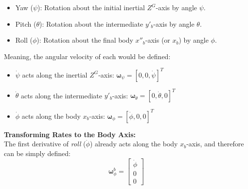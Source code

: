 \documentclass[conf]{new-aiaa}
\begin{document}
\begin{itemize}
    \item Yaw ($\psi$): Rotation about the initial inertial $Z^G$-axis by angle $\psi$.
    \item Pitch ($\theta$): Rotation about the intermediate $y'_b$-axis by angle $\theta$.
    \item Roll ($\phi$): Rotation about the final body $x''_b$-axis (or $x_b$) by angle $\phi$.
\end{itemize}
Meaning, the angular velocity of each would be defined:

\begin{itemize}
    \item $\dot{\psi}$ acts along the inertial $Z^G$-axis: $\boldsymbol{\omega}_{\psi} = [0, 0, \dot{\psi}]^T$
    \item $\dot{\theta}$ acts along the intermediate $y'_b$-axis: $\boldsymbol{\omega}_{\theta} = [0, \dot{\theta}, 0]^T$
    \item $\dot{\phi}$ acts along the body $x_b$-axis: $\boldsymbol{\omega}_{\phi} = [\dot{\phi}, 0, 0]^T$
\end{itemize}
\textbf{Transforming Rates to the Body Axis:}\\
\noindent The first derivative of \textit{roll} ($\dot{\phi}$) already acts along the body $x_b$-axis, and therefore can be simply defined:
$$\boldsymbol{\omega}_{\phi}^b = \begin{bmatrix} \dot{\phi} \\ 0 \\ 0 \end{bmatrix}$$
\end{document}
